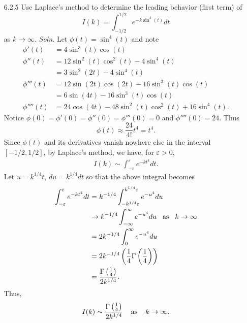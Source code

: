 \documentclass{article}
\begin{document}
\begin{itemize}
    \item[6.2.5] Use Laplace's method to determine the leading behavior (first term) of
    \[I(k) = \int_{-1/2}^{1/2} e^{-k\sin^4(t)}dt\]
    as $k \to \infty$.
    \newline\newline
    \textit{Soln.} Let $\phi(t) = \sin^4(t)$ and note
    \begin{align*}
        \phi'(t) &= 4\sin^3(t)\cos(t)\\
        \phi''(t) &= 12\sin^2(t)\cos^2(t) - 4\sin^4(t)\\
        &= 3\sin^2(2t) - 4\sin^4(t)\\
        \phi'''(t) &= 12\sin(2t)\cos(2t) - 16\sin^3(t)\cos(t)\\
        &= 6\sin(4t) - 16\sin^3(t)\cos(t)\\
        \phi''''(t) &= 24\cos(4t) - 48\sin^2(t)\cos^2(t) + 16\sin^4(t).
    \end{align*}
    Notice $\phi(0) = \phi'(0) = \phi''(0) = \phi'''(0) = 0$ and $\phi''''(0) = 24$. Thus
    \[\phi(t) \approx \frac{24}{4!}t^4 = t^4.\]
    Since $\phi(t)$ and its derivatives vanish nowhere else in the interval $[-1/2, 1/2]$, by Laplace's method, we have, for $\varepsilon > 0$,
    \begin{align*}
        I(k) \sim \int_{-\varepsilon}^{\varepsilon}e^{-kt^4}dt.
    \end{align*}
    Let $u = k^{1/4}t$, $du = k^{1/4}dt$ so that the above integral becomes
    \begin{align*}
        \int_{-\varepsilon}^{\varepsilon}e^{-kt^4}dt &= k^{-1/4}\int_{-k^{1/4}\varepsilon}^{k^{1/4}\varepsilon}e^{-u^4}du\\
        &\to k^{-1/4}\int_{-\infty}^{\infty}e^{-u^4}du \hspace{0.3cm} \text{as} \hspace{0.3cm} k \to \infty\\
        &= 2k^{-1/4}\int_0^{\infty}e^{-u^4}du\\
        &= 2k^{-1/4}\left(\frac{1}{4}\Gamma\left(\frac{1}{4}\right)\right)\\
        &= \frac{\Gamma\left(\tfrac{1}{4}\right)}{2k^{1/4}}.
    \end{align*}
    Thus, 
    \[I(k) \sim \frac{\Gamma\left(\tfrac{1}{4}\right)}{2k^{1/4}} \hspace{0.4cm} \text{as} \hspace{0.4cm} k \to \infty.\]
    

    \pagebreak


\end{itemize}
\end{document}
